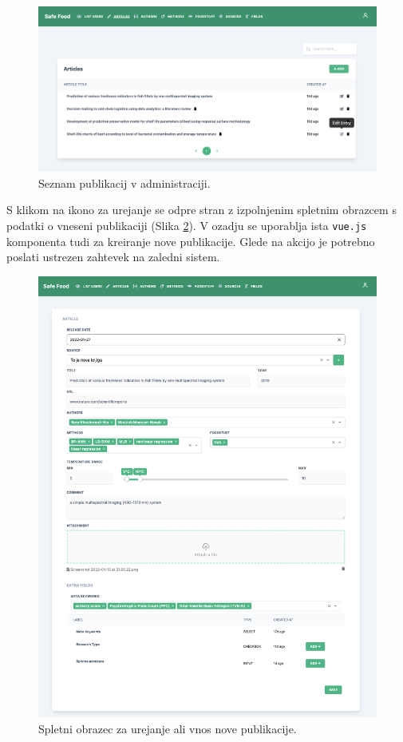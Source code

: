 \documentclass[a4paper, 12pt]{book}
\begin{document}
\begin{figure}[h]
\begin{center}
\includegraphics[width=1\textwidth]{slike/list-articles.png}
\end{center}
\caption{ Seznam publikacij v administraciji. }
\label{list-articles}
\end{figure}

S klikom na ikono za urejanje se odpre stran z izpolnjenim spletnim obrazcem s podatki o vneseni publikaciji (Slika \ref{edit-articles}). V ozadju se uporablja ista \verb=vue.js= komponenta tudi za kreiranje nove publikacije. Glede na akcijo je potrebno poslati ustrezen zahtevek na zaledni sistem.

\begin{figure}[h]
\begin{center}
\includegraphics[width=1\textwidth]{slike/form-create-article.png}
\end{center}
\caption{ Spletni obrazec za urejanje ali vnos nove publikacije. }
\label{edit-articles}
\end{figure}
\end{document}
